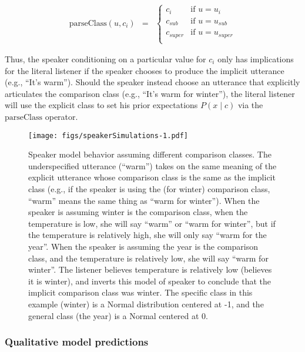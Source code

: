 \documentclass[doc]{apa6}
\begin{document}
\begin{eqnarray}
\text{parseClass}(u, c_i) & = &
\begin{cases}
c_{i} & \text{if } u = u_{i}\\
c_{sub} & \text{if } u = u_{sub}\\
c_{super} & \text{if } u = u_{super}\\
\end{cases}
\end{eqnarray}

Thus, the speaker conditioning on a particular value for \(c_{i}\) only
has implications for the literal listener if the speaker chooses to
produce the implicit utterance (e.g., ``It's warm''). Should the
speaker instead choose an utterance that explicitly articulates the
comparison class (e.g., ``It's warm for winter''), the literal
listener will use the explicit class to set his prior expectations
\(P(x \mid c)\) via the \(\text{parseClass}\) operator.

\begin{figure}
\centering
\texttt{[image: figs/speakerSimulations-1.pdf]}
\caption{\label{fig:speakerSimulations}Speaker model behavior assuming
different comparison classes. The underspecified utterance
(``warm'') takes on the same meaning of the explicit utterance
whose comparison class is the same as the implicit class (e.g., if the
speaker is using the (for winter) comparison class, ``warm'' means
the same thing as ``warm for winter''). When the speaker is
assuming winter is the comparison class, when the temperature is low, she
will say ``warm'' or ``warm for winter'', but if the
temperature is relatively high, she will only say ``warm for the
year''. When the speaker is assuming the year is the comparison class,
and the temperature is relatively low, she will say ``warm for
winter''. The listener believes temperature is relatively low (believes
it is winter), and inverts this model of speaker to conclude that the
implicit comparison class was winter. The specific class in this example
(winter) is a Normal distribution centered at -1, and the general class
(the year) is a Normal centered at 0.}
\end{figure}

\subsubsection{Qualitative model
predictions}
\end{document}
